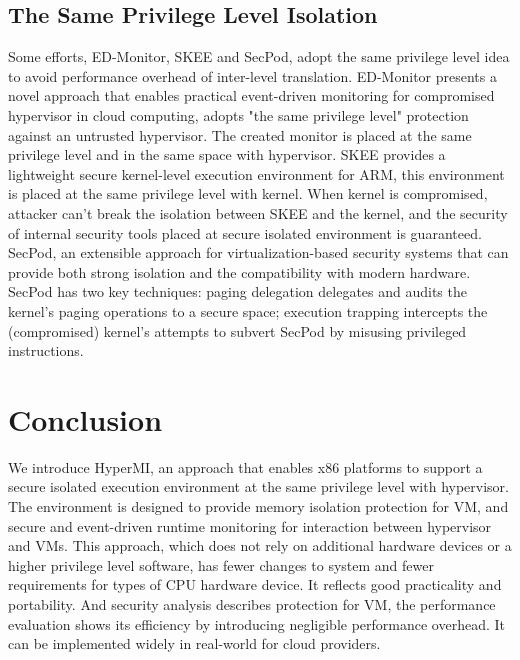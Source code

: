 \documentclass[conference]{IEEEtran}
\begin{document}
\subsection{The Same Privilege Level Isolation}
Some efforts, ED-Monitor\cite{Deng2017Dancing}, SKEE\cite{Azab2016SKEE} and SecPod\cite{Wang2015SecPod}, adopt the same privilege level idea to avoid performance overhead of inter-level translation. ED-Monitor presents a novel approach that enables practical event-driven monitoring for compromised hypervisor in cloud computing, adopts "the same privilege level" protection against an untrusted hypervisor. The created monitor is placed at the same privilege level and in the same space with hypervisor. SKEE provides a lightweight secure kernel-level execution environment for ARM, this environment is placed at the same privilege level with kernel. When kernel is compromised, attacker can't break the isolation between SKEE and the kernel, and the security of internal security tools placed at secure isolated environment is guaranteed. SecPod, an extensible approach for virtualization-based security systems that can provide both strong isolation and the compatibility with modern hardware. SecPod has two key techniques: paging delegation delegates and audits the kernel's paging operations to a secure space; execution trapping intercepts the (compromised) kernel's attempts to subvert SecPod by misusing privileged instructions.
\section{Conclusion}
We introduce HyperMI, an approach that enables x86 platforms to support a secure isolated execution environment at the same privilege level with hypervisor. The environment is designed to provide memory isolation protection for VM, and secure and event-driven runtime monitoring for interaction between hypervisor and VMs. This approach, which does not rely on additional hardware devices or a higher privilege level software, has fewer changes to system and fewer requirements for types of CPU hardware device. It reflects good practicality and portability. And security analysis describes protection for VM, the performance evaluation shows its efficiency by introducing negligible performance overhead. It can be implemented widely in real-world for cloud providers.
 

\end{document}
